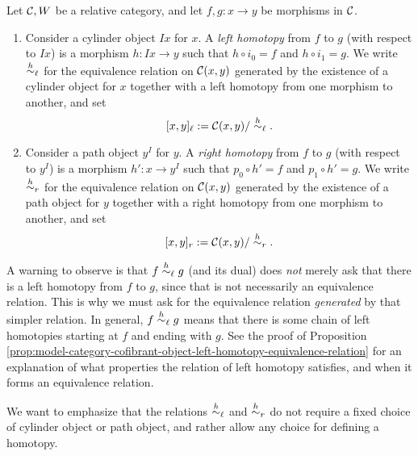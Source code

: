 \begin{definition}
	Let \(\mathcal{C},W\) be a relative category, and let \(f,g\!:x\to y\) be morphisms in \(\mathcal{C}\).
	\begin{enumerate}[label=(\roman*)]
		\item Consider a cylinder object \(Ix\) for \(x\). A \emph{left homotopy} from \(f\) to \(g\) (with respect to \(Ix\)) is a morphism \(h\!:Ix \to y\)
		such that \(h\circ i_0 = f\) and \(h\circ i_1 = g\). We write \(\overset{h}{\sim}_\ell\) for the equivalence relation on \(\mathcal{C}(x,y)\) generated by the existence of
		a cylinder object for \(x\) together with a left homotopy from one morphism to another, and set
		\[ [x,y]_\ell := \mathcal{C}(x,y)/\overset{h}{\sim}_\ell. \]
		\item Consider a path object \(y^I\) for \(y\). A \emph{right homotopy} from \(f\) to \(g\) (with respect to \(y^I\)) is a morphism \(h'\!:x\to y^I\)
		such that \(p_0\circ h' = f\) and \(p_1\circ h' = g\). We write \(\overset{h}{\sim}_r\) for the equivalence relation on \(\mathcal{C}(x,y)\) generated by the existence of
		a path object for \(y\) together with a right homotopy from one morphism to another, and set
		\[ [x,y]_r := \mathcal{C}(x,y)/\overset{h}{\sim}_r. \]
	\end{enumerate}
\end{definition}

\begin{remark}
	A warning to observe is that \(f \overset{h}{\sim}_\ell g\) (and its dual) does \emph{not} merely ask that there is a left homotopy from \(f\) to \(g\), since that is not
	necessarily an equivalence relation. This is why we must ask for the equivalence relation \emph{generated} by that simpler relation. In general, \(f\overset{h}{\sim}_\ell g\)
	means that there is some chain of left homotopies starting at \(f\) and ending with \(g\). See the proof of Proposition \ref{prop:model-category-cofibrant-object-left-homotopy-equivalence-relation}
	for an explanation of what properties the relation of left homotopy satisfies, and when it forms an equivalence relation.
\end{remark}
\begin{remark}
	We want to emphasize that the relations \(\overset{h}{\sim}_\ell\) and \(\overset{h}{\sim}_r\) do not require a fixed choice of cylinder object or path object, and rather allow any
	choice for defining a homotopy.
\end{remark}

